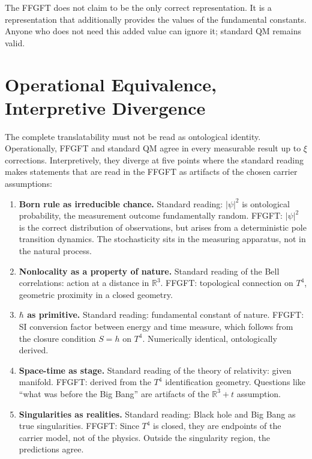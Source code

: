 The FFGFT does not claim to be the only correct representation. It is a representation that additionally provides the values of the
fundamental constants. Anyone who does not need this added value
can ignore it; standard QM remains valid.

\section{Operational Equivalence, Interpretive Divergence}

The complete translatability must not be read as ontological identity.
Operationally, FFGFT and standard QM agree in every measurable result up to $\xi$ corrections. Interpretively,
they diverge at five points where the standard reading makes statements
that are read in the FFGFT as artifacts of the chosen carrier assumptions:

\begin{enumerate}
  \item \textbf{Born rule as irreducible chance.} Standard reading:
        $|\psi|^2$ is ontological probability, the measurement outcome
        fundamentally random. FFGFT: $|\psi|^2$ is the correct distribution
        of observations, but arises from a deterministic pole transition dynamics. The stochasticity sits in the measuring apparatus,
        not in the natural process.
  \item \textbf{Nonlocality as a property of nature.} Standard reading
        of the Bell correlations: action at a distance in $\mathbb{R}^3$. FFGFT:
        topological connection on $T^4$, geometric proximity in a
        closed geometry.
  \item \textbf{$\hbar$ as primitive.} Standard reading: fundamental
        constant of nature. FFGFT: SI conversion factor between energy and
        time measure, which follows from the closure condition $S = h$ on $T^4$.
        Numerically identical, ontologically derived.
  \item \textbf{Space-time as stage.} Standard reading of the theory of
        relativity: given manifold. FFGFT: derived from the
        $T^4$ identification geometry. Questions like
        \enquote{what was before the Big Bang} are artifacts of the
        $\mathbb{R}^3\!+\!t$ assumption.
  \item \textbf{Singularities as realities.} Standard reading: Black
        hole and Big Bang as true singularities. FFGFT: Since $T^4$
        is closed, they are endpoints of the carrier model, not of the
        physics. Outside the singularity region, the predictions
        agree.
\end{enumerate}

